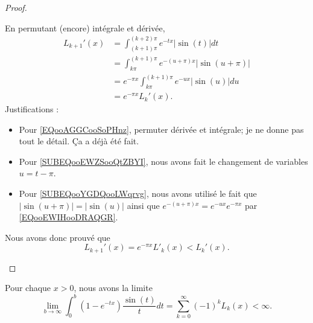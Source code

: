 \begin{proof}
\begin{subproof}
		En permutant (encore) intégrale et dérivée,
		\begin{subequations}
			\begin{align}
				L_{k+1}'(x) & =\int_{(k+1)\pi}^{(k+2)\pi} e^{-tx}| \sin(t) |dt        \label{EQooAGGCooSoPHnz}       \\
				            & =\int_{k\pi}^{(k+1)\pi} e^{-(u+\pi)x}| \sin(u+\pi) |       \label{SUBEQooEWZSooQtZBYI} \\
				            & = e^{-\pi x}\int_{k\pi}^{(k+1)\pi} e^{-ux}| \sin(u) |du    \label{SUBEQooYGDQooLWqrvg} \\
				            & = e^{-\pi x}L_k'(x).
			\end{align}
		\end{subequations}
		Justifications :
		\begin{itemize}
			\item Pour \eqref{EQooAGGCooSoPHnz}, permuter dérivée et intégrale; je ne donne pas tout le détail. Ça a déjà été fait.
			\item Pour \eqref{SUBEQooEWZSooQtZBYI}, nous avons fait le changement de variables \( u=t-\pi\).
			\item Pour \eqref{SUBEQooYGDQooLWqrvg}, nous avons utilisé le fait que \( | \sin(u+\pi) |=| \sin(u) |\) ainsi que \(  e^{-(u+\pi)x}= e^{-ux} e^{-\pi x}\) par \eqref{EQooEWIHooDRAQGR}.
		\end{itemize}
		Nous avons donc prouvé que
		\begin{equation}
			L_{k+1}'(x)= e^{-\pi x}L'_{k}(x)<L_k'(x).
		\end{equation}
	\end{subproof}
\end{proof}

\begin{lemma}       \label{LEMooSWFDooGLfwoD}
	Pour chaque \( x>0\), nous avons la limite
	\begin{equation}
		\lim_{b\to \infty} \int_0^{b}(1- e^{-tx})\frac{ \sin(t) }{ t }dt=\sum_{k=0}^{\infty}(-1)^kL_k(x)<\infty.
	\end{equation}
\end{lemma}

